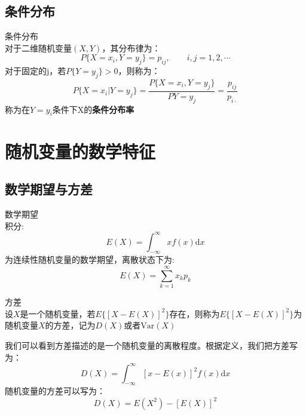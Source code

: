 \subsection{条件分布}
\begin{definition}{条件分布\\}
    对于二维随机变量$(X,Y)$，其分布律为：
    \begin{equation*}
        P\{X=x_i,Y=y_j\}=p_{ij},\qquad i,j=1,2,\cdots
    \end{equation*}
    对于固定的j，若$P\{Y=y_j\}>0$，则称为：
    \begin{equation}
        P\{X=x_i|Y=y_j\}=\frac{P\{X=x_i,Y=y_j\}}{P{Y=y_j}}=\frac{p_{ij}}{p_{i\cdot}}
    \end{equation}
    称为在$Y=y_i$条件下X的\textbf{条件分布率}
\end{definition}


\section{随机变量的数学特征}
\subsection{数学期望与方差}

\begin{definition}{数学期望}
    \\积分:
    \begin{equation}
        E(X)=\int_{-\infty}^{\infty}xf(x)\mathrm{d} x
    \end{equation}
    为连续性随机变量的数学期望，离散状态下为:
    \begin{equation}
        E(X)=\sum_{k=1}^{\infty}x_k p_k
    \end{equation}
\end{definition}
\begin{definition}{方差\\}
    设$X$是一个随机变量，若$E\{ [X-E(X)]^2 \}$存在，则称为$E\{ [X-E(X)]^2 \}$为随机变量$X$的方差，记为$D(X)$或者$\mathrm{Var}(X)$
\end{definition}


\setlength{\parindent}{2em}我们可以看到方差描述的是一个随机变量的离散程度。根据定义，我们把方差写为：
\begin{equation}
    D(X)=\int^{\infty}_{-\infty} [x-E(x)]^2 f(x) \mathrm{d} x
\end{equation}
随机变量的方差可以写为：
\begin{equation}
    D(X)=E(X^2)-[E(X)]^2
\end{equation}

